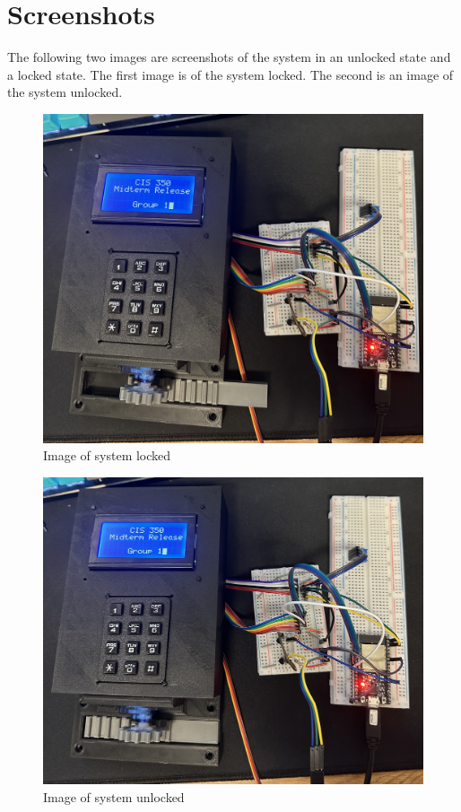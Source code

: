 \section{Screenshots}
The following two images are screenshots of the system in an unlocked state and a locked state. The first image is of the system locked. The second is an image of the system unlocked. 
\begin{figure}[htb]
    \begin{center}
        \includegraphics[width = \textwidth]{Images/Screenshot_of_system_locked.jpg}
        \caption{Image of system locked}
        \label{fig: Locked System}
    \end{center}
\end{figure}

\begin{figure}[htb]
    \begin{center}
        \includegraphics[width = \textwidth]{Images/Screenshot_of_system_unlocked.jpg}
        \caption{Image of system unlocked}
        \label{fig: Unlocked system}
    \end{center}
\end{figure}